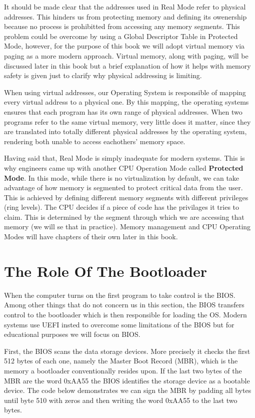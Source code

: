 It should be made clear that the addresses used in Real Mode refer to physical addresses. This hinders us from protecting
memory and defining its owenership because no process is prohibitted from accessing any memory segments.
This problem could be overcome by using a Global Descriptor Table in Protected Mode, however, for the purpose of this book we 
will adopt virtual memory via paging as a more modern approach. Virtual memory, along with paging, will be discussed later in this 
book but a brief explanation of how it helps with memory safety is given just to clarify why physical addressing is limiting.

When using virtual addresses, our Operating System is responsible of mapping every virtual address to a physical one.
By this mapping, the operating systems ensures that each program has its own range of physical addresses.
When two programs refer to the same virtual memory, very little does it matter, since they are translated into 
totally different physical addresses by the operating system, rendering both unable to access eachothers' memory space.

Having said that, Real Mode is simply inadequate for modern systems. This is why engineers came up with another CPU 
Operation Mode called \textbf{Protected Mode}. In this mode, while there is no virtualization by default, we can 
take advantage of how memory is segmented to protect critical data from the user. This is achieved by defining different 
memory segments with different privileges (ring levels). The CPU decides if a piece of code has the privilages 
it tries to claim. This is determined by the segment through which we are accessing that memory (we will se that in
practice). Memory management and CPU Operating Modes will have chapters of their own later in this book.

\section{The Role Of The Bootloader}

When the computer turns on the first program to take control is the BIOS. Among other things that do not concern us in 
this section, the BIOS transfers control to the bootloader which is then responsible for loading the OS. Modern systems 
use UEFI insted to overcome some limitations of the BIOS but for educational purposes we will focus on BIOS.

First, the BIOS scans the data storage devices. More precisely it checks the first 512 bytes of each one, namely the Master Boot Record 
(MBR), which is the memory a bootloader conventionally resides upon. If the last two bytes of the MBR are the word 0xAA55 the BIOS 
identifies the storage device as a bootable device. The code below demonstrates we can sign the MBR by padding all bytes until byte 510
with zeros and then writing the word 0xAA55 to the last two bytes.

